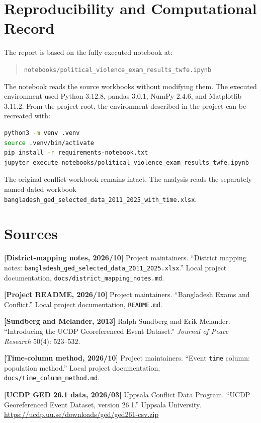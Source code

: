 \documentclass[11pt]{article}
\begin{document}
\section{Reproducibility and Computational Record}

The report is based on the fully executed notebook at:

\begin{quote}
\texttt{notebooks/political\_violence\_exam\_results\_twfe.ipynb}
\end{quote}

The notebook reads the source workbooks without modifying them. The executed environment used Python 3.12.8, pandas 3.0.1, NumPy 2.4.6, and Matplotlib 3.11.2. From the project root, the environment described in the project can be recreated with:

\begin{lstlisting}[language=bash]
python3 -m venv .venv
source .venv/bin/activate
pip install -r requirements-notebook.txt
jupyter execute notebooks/political_violence_exam_results_twfe.ipynb
\end{lstlisting}

The original conflict workbook remains intact. The analysis reads the separately named dated workbook \texttt{bangladesh\_ged\_selected\_data\_2011\_2025\_with\_time.xlsx}.

\clearpage
\section*{Sources}

\textbf{[District-mapping notes, 2026/10]} Project maintainers. ``District mapping notes: \texttt{bangladesh\_ged\_selected\_data\_2011\_2025.xlsx}.'' Local project documentation, \texttt{docs/district\_mapping\_notes.md}.

\textbf{[Project README, 2026/10]} Project maintainers. ``Bangladesh Exams and Conflict.'' Local project documentation, \texttt{README.md}.

\textbf{[Sundberg and Melander, 2013]} Ralph Sundberg and Erik Melander. ``Introducing the UCDP Georeferenced Event Dataset.'' \emph{Journal of Peace Research} 50(4): 523--532.

\textbf{[Time-column method, 2026/10]} Project maintainers. ``Event \texttt{time} column: population method.'' Local project documentation, \texttt{docs/time\_column\_method.md}.

\textbf{[UCDP GED 26.1 data, 2026/03]} Uppsala Conflict Data Program. ``UCDP Georeferenced Event Dataset, version 26.1.'' Uppsala University. \url{https://ucdp.uu.se/downloads/ged/ged261-csv.zip}
\end{document}
